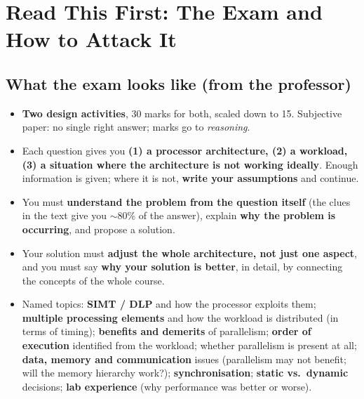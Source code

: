\section{Read This First: The Exam and How to Attack It}\label{ch:method}

\subsection{What the exam looks like (from the professor)}\label{sec:examformat}
\begin{prof}
\begin{itemize}[leftmargin=*]
\item \textbf{Two design activities}, 30 marks for both, scaled down to 15. Subjective paper: no single right answer; marks go to \emph{reasoning}.
\item Each question gives you \textbf{(1) a processor architecture, (2) a workload, (3) a situation where the architecture is not working ideally}. Enough information is given; where it is not, \textbf{write your assumptions} and continue.
\item You must \textbf{understand the problem from the question itself} (the clues in the text give you $\sim$80\% of the answer), explain \textbf{why the problem is occurring}, and propose a solution.
\item Your solution must \textbf{adjust the whole architecture, not just one aspect}, and you must say \textbf{why your solution is better}, in detail, by connecting the concepts of the whole course.
\item Named topics: \textbf{SIMT / DLP} and how the processor exploits them; \textbf{multiple processing elements} and how the workload is distributed (in terms of timing); \textbf{benefits and demerits} of parallelism; \textbf{order of execution} identified from the workload; whether parallelism is present at all; \textbf{data, memory and communication} issues (parallelism may not benefit; will the memory hierarchy work?); \textbf{synchronisation}; \textbf{static vs.\ dynamic} decisions; \textbf{lab experience} (why performance was better or worse).
\end{itemize}
\end{prof}

